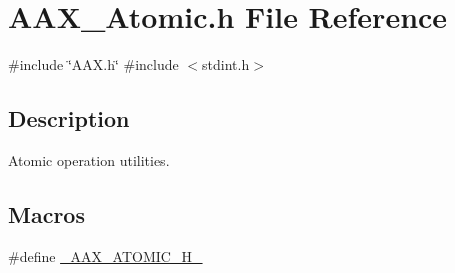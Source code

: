 \hypertarget{a00398}{}\section{A\+A\+X\+\_\+\+Atomic.\+h File Reference}
\label{a00398}
{\ttfamily \#include \char`\"{}A\+A\+X.\+h\char`\"{}}\newline
{\ttfamily \#include $<$stdint.\+h$>$}\newline


\subsection{Description}
Atomic operation utilities. 

\subsection*{Macros}
\begin{DoxyCompactItemize}
\item 
\#define \mbox{\hyperlink{a00398_a95d8ffad4ab4b65ff2d28aa76e167daf}{\+\_\+\+A\+A\+X\+\_\+\+A\+T\+O\+M\+I\+C\+\_\+\+H\+\_\+}}
\end{DoxyCompactItemize}
